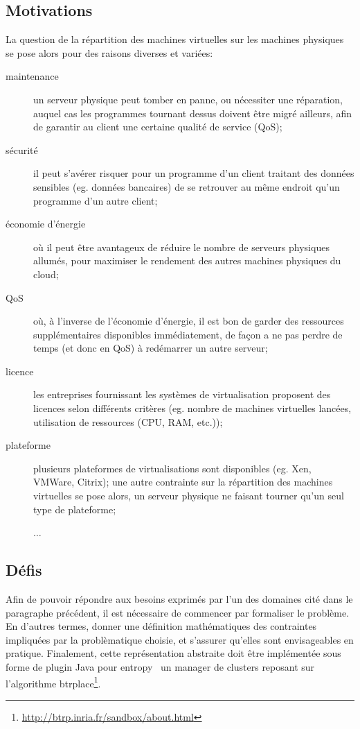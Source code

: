 \documentclass[a4paper]{article}
\begin{document}
\subsection{Motivations}
La question de la répartition des machines virtuelles sur les machines
physiques se pose alors pour des raisons diverses et variées:
\begin{description}
	\item[maintenance] un serveur physique peut tomber en panne, ou
		nécessiter une réparation, auquel cas les programmes
		tournant dessus doivent être migré ailleurs, afin de
		garantir au client une certaine qualité de service (QoS);
	\item[sécurité] il peut s'avérer risquer pour un programme d'un
		client traitant des données sensibles (eg. données bancaires)
		de se retrouver au même endroit qu'un programme d'un
		autre client;
	\item[économie d'énergie] où il peut être avantageux de réduire
		le nombre de serveurs physiques allumés, pour maximiser
		le rendement des autres machines physiques du cloud;
	\item[QoS] où, à l'inverse de l'économie d'énergie, il est bon
		de garder des ressources supplémentaires disponibles immédiatement,
		de façon a ne pas perdre de temps (et donc en QoS) à redémarrer
		un autre serveur;		
	\item[licence] les entreprises fournissant les systèmes de virtualisation
		proposent des licences selon différents critères (eg. nombre de
		machines virtuelles lancées, utilisation de ressources (CPU, RAM, etc.));
	\item[plateforme] plusieurs plateformes de virtualisations sont disponibles
		(eg. Xen, VMWare, Citrix); une autre contrainte sur la
		répartition des machines virtuelles se pose alors, un serveur
		physique ne faisant tourner qu'un seul type de plateforme;
	\item[] $\ldots$
\end{description}
\subsection{Défis}
Afin de pouvoir répondre aux besoins exprimés par l'un des domaines
cité dans le paragraphe précédent, il est nécessaire de commencer
par formaliser le problème. En d'autres termes, donner une définition
mathématiques des contraintes impliquées par la problèmatique choisie,
et s'assurer qu'elles sont envisageables en pratique. Finalement, cette
représentation abstraite doit être implémentée sous forme de plugin
Java pour entropy~\cite{herm2009} un manager de clusters reposant sur
l'algorithme btrplace\footnote{\url{http://btrp.inria.fr/sandbox/about.html}}.
\end{document}
